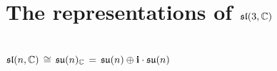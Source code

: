 

\chapter{The representations of $\mathfrak{sl}(3,\mathbb{C})$}
\setcounter{theorem}{0}
\setcounter{equation}{0}


\renewcommand{\theenumi}{\roman{enumi}}
\renewcommand{\labelenumi}{\textnormal{(\theenumi)}$\;\;$}


\section{$\mathfrak{sl}(n,\mathbb{C}) \,\cong\, \mathfrak{su}(n)_{\mathbb{C}} \,=\, \mathfrak{su}(n) \oplus \mathbf{i}\cdot\mathfrak{su}(n)$}


